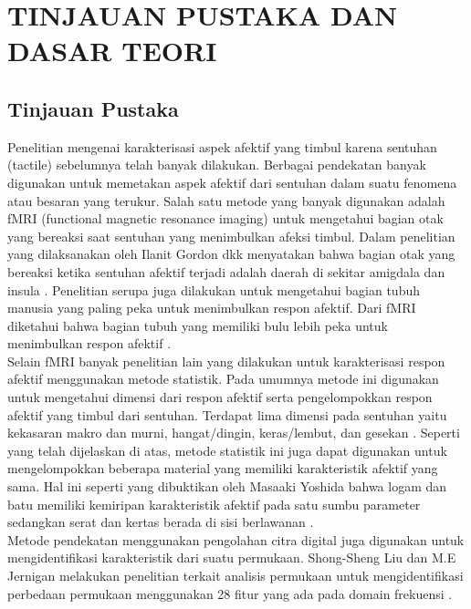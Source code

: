 

\chapter{TINJAUAN PUSTAKA DAN DASAR TEORI}                

\section{Tinjauan Pustaka}
\indent Penelitian mengenai karakterisasi aspek afektif yang timbul karena sentuhan (tactile) sebelumnya telah banyak dilakukan. Berbagai pendekatan banyak digunakan untuk memetakan aspek afektif dari sentuhan dalam suatu fenomena atau besaran yang terukur. Salah satu metode yang banyak digunakan adalah fMRI (functional magnetic resonance imaging) untuk mengetahui bagian otak yang bereaksi saat sentuhan yang menimbulkan afeksi timbul. Dalam penelitian yang dilaksanakan oleh Ilanit Gordon dkk menyatakan bahwa bagian otak yang bereaksi ketika sentuhan afektif terjadi adalah daerah di sekitar amigdala dan insula \cite{Gordon2013}⁠. Penelitian serupa juga dilakukan untuk mengetahui bagian tubuh manusia yang paling peka untuk menimbulkan respon afektif. Dari fMRI diketahui bahwa bagian tubuh yang memiliki bulu lebih peka untuk menimbulkan respon afektif \cite{Mcglone2012}⁠.\\ 
\indent Selain fMRI banyak penelitian lain yang dilakukan untuk karakterisasi respon afektif  menggunakan metode statistik. Pada umumnya metode ini digunakan untuk mengetahui dimensi dari respon afektif serta pengelompokkan respon afektif yang timbul dari sentuhan. Terdapat lima dimensi pada sentuhan yaitu kekasaran makro dan murni, hangat/dingin, keras/lembut, dan gesekan \cite{Okamoto2013}⁠. Seperti yang telah dijelaskan di atas, metode statistik ini juga dapat digunakan untuk mengelompokkan beberapa material yang memiliki karakteristik afektif yang sama. Hal ini seperti yang dibuktikan oleh Masaaki Yoshida bahwa logam dan batu memiliki kemiripan karakteristik afektif pada satu sumbu parameter sedangkan serat dan kertas berada di sisi berlawanan \cite{YOSHIDA1968}⁠.\\
\indent Metode pendekatan menggunakan pengolahan citra digital juga digunakan untuk mengidentifikasi karakteristik dari suatu permukaan. Shong-Sheng Liu dan  M.E Jernigan melakukan penelitian terkait analisis permukaan untuk mengidentifikasi perbedaan permukaan menggunakan 28 fitur yang ada pada domain frekuensi \cite{Liu1990}⁠.  
 
